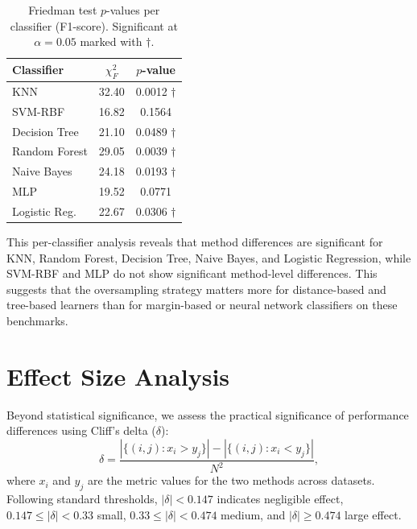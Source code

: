 \begin{table}[H]
\centering
\caption{Friedman test $p$-values per classifier (F1-score). Significant at $\alpha = 0.05$ marked with $\dagger$.}
\label{tab:stat:per_clf}
\begin{tabular}{lcc}
\toprule
\textbf{Classifier} & \textbf{$\chi_F^2$} & \textbf{$p$-value} \\
\midrule
KNN           & 32.40 & 0.0012 $\dagger$ \\
SVM-RBF       & 16.82 & 0.1564 \\
Decision Tree & 21.10 & 0.0489 $\dagger$ \\
Random Forest & 29.05 & 0.0039 $\dagger$ \\
Naive Bayes   & 24.18 & 0.0193 $\dagger$ \\
MLP           & 19.52 & 0.0771 \\
Logistic Reg. & 22.67 & 0.0306 $\dagger$ \\
\bottomrule
\end{tabular}
\end{table}

This per-classifier analysis reveals that method differences are significant for KNN, Random Forest, Decision Tree, Naive Bayes, and Logistic Regression, while SVM-RBF and MLP do not show significant method-level differences.
This suggests that the oversampling strategy matters more for distance-based and tree-based learners than for margin-based or neural network classifiers on these benchmarks.


\section{Effect Size Analysis}
\label{sec:stat:effect_size}

Beyond statistical significance, we assess the practical significance of performance differences using Cliff's delta ($\delta$):
\begin{equation}
    \delta = \frac{|\{(i, j) : x_i > y_j\}| - |\{(i, j) : x_i < y_j\}|}{N^2},
\end{equation}
where $x_i$ and $y_j$ are the metric values for the two methods across datasets.
Following standard thresholds, $|\delta| < 0.147$ indicates negligible effect, $0.147 \leq |\delta| < 0.33$ small, $0.33 \leq |\delta| < 0.474$ medium, and $|\delta| \geq 0.474$ large effect.

